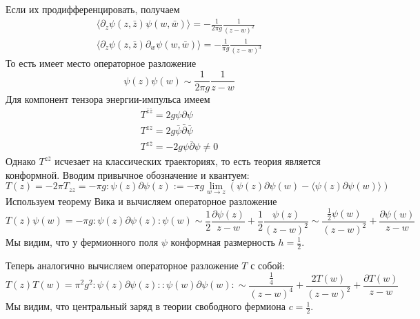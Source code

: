\documentclass[a4paper,12pt]{article}
\theoremstyle{definition}
\theoremstyle{definition}
\theoremstyle{definition}
\begin{document}
Если их продифференцировать, получаем
\begin{eqnarray}
  \label{eq:294}
  \langle \partial_z \psi(z,\bar z) \psi(w,\bar w) \rangle=-\frac{1}{2\pi g} \frac{1}{(z-w)^2}\\
  \langle \partial_z \psi(z,\bar z) \partial_w \psi(w,\bar w) \rangle=-\frac{1}{\pi g} \frac{1}{(z-w)^3}
\end{eqnarray}
То есть имеет место операторное разложение
\begin{equation}
  \label{eq:295}
  \psi(z)\psi(w)\sim \frac{1}{2\pi g} \frac{1}{z-w}
\end{equation}
Для компонент тензора энергии-импульса имеем
\begin{eqnarray}
  \label{eq:296}
  T^{\bar z\bar z} =2g\psi\partial \psi\\
  T^{ z z} =2g\bar \psi\bar\partial \bar \psi\\
  T^{ z\bar z} =-2g\psi\bar\partial \psi\neq 0
\end{eqnarray}
Однако $T^{z\bar z}$ исчезает на классических траекториях, то есть теория является конформной.
Вводим привычное обозначение и квантуем:
\begin{equation}
  \label{eq:297}
  T(z)=-2\pi T_{zz}=-\pi g :\psi(z) \partial \psi(z):=-\pi g\lim_{w\to z}(\psi(z)\partial \psi(w) -\langle\psi(z) \partial \psi(w)\rangle)
\end{equation}
Используем теорему Вика и вычисляем операторное разложение
\begin{equation}
  \label{eq:298}
  T(z) \psi(w)=-\pi g:\psi(z)\partial \psi(z) :\psi(w) \sim \frac{1}{2}\frac{\partial \psi(z)}{z-w} +\frac{1}{2}\frac{\psi(z)}{(z-w)^2} \sim \frac{\frac{1}{2} \psi(w)}{(z-w)^2} +\frac{\partial \psi(w)}{z-w}
\end{equation}
Мы видим, что у фермионного поля $\psi$ конформная размерность $h=\frac{1}{2}$. 

Теперь аналогично вычисляем операторное разложение $T$ с собой:
\begin{equation}
  \label{eq:299}
  T(z)T(w)=\pi^2 g^2 :\psi(z)\partial \psi(z)::\psi(w)\partial \psi(w): \sim \frac{\frac{1}{4}}{(z-w)^4} +\frac{2T(w)}{(z-w)^2} +\frac{\partial T(w)}{z-w}
\end{equation}
Мы видим, что центральный заряд в теории свободного фермиона $c=\frac{1}{2}$.
\end{document}
